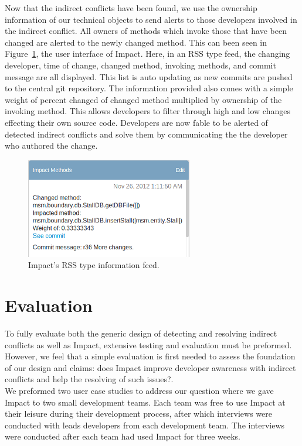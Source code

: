 \documentclass[conference]{IEEEtran}
\begin{document}
Now that the indirect conflicts have been found, we use the
ownership information of our technical objects to send alerts to
those developers involved in the indirect conflict. All owners
of methods which invoke those that have been changed are alerted
to the newly changed method. This can been seen in
Figure~\ref{fig:impact}, the user interface of Impact. Here, in an RSS type
feed, the changing developer, time of change, changed method,
invoking methods, and commit message are all displayed. This 
list is auto updating as new commits are pushed to the central
git repository. The information provided also comes with a simple
weight of percent changed of changed method multiplied by 
ownership of the invoking method. This allows developers to filter
through high and low changes effecting their own source code.
Developers are now fable to be alerted of detected indirect
conflicts and solve them by communicating the the developer
who authored the change.\\

\begin{figure}[t!]
\includegraphics{images/ImpactDemo}
\caption{Impact's RSS type information feed.\label{fig:impact}}
\end{figure}


\section{Evaluation}
To fully evaluate both the generic design of detecting and resolving
indirect conflicts as well as Impact, extensive testing and evaluation
must be preformed. However, we feel that a simple evaluation is
first needed to assess the foundation of our design and claims:
does Impact improve developer awareness with indirect conflicts
and help the resolving of such issues?.\\

We preformed two user case studies to address our question where
we gave Impact to two small development teams. Each team was
free to use Impact at their leisure during their development process,
after which interviews were conducted with leads developers from 
each development team. The interviews were conducted after each
team had used Impact for three weeks.\\
\end{document}
